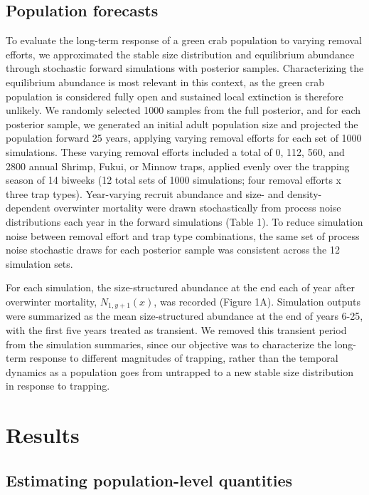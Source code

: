 \documentclass{article}
\begin{document}
\subsection{Population forecasts}

To evaluate the long-term response of a green crab population to varying removal efforts, we approximated the stable size distribution and equilibrium abundance through stochastic forward simulations with posterior samples. Characterizing the equilibrium abundance is most relevant in this context, as the green crab population is considered fully open and sustained local extinction is therefore unlikely. We randomly selected 1000 samples from the full posterior, and for each posterior sample, we generated an initial adult population size and projected the population forward 25 years, applying varying removal efforts for each set of 1000 simulations. These varying removal efforts included a total of 0, 112, 560, and 2800 annual Shrimp, Fukui, or Minnow traps, applied evenly over the trapping season of 14 biweeks (12 total sets of 1000 simulations; four removal efforts x three trap types). Year-varying recruit abundance and size- and density-dependent overwinter mortality were drawn stochastically from process noise distributions each year in the forward simulations (Table 1). To reduce simulation noise between removal effort and trap type combinations, the same set of process noise stochastic draws for each posterior sample was consistent across the 12 simulation sets. 

For each simulation, the size-structured abundance at the end each of year after overwinter mortality, $N_{1,y+1}(x)$, was recorded (Figure 1A). Simulation outputs were summarized as the mean size-structured abundance at the end of years 6-25, with the first five years treated as transient. We removed this transient period from the simulation summaries, since our objective was to characterize the long-term response to different magnitudes of trapping, rather than the temporal dynamics as a population goes from untrapped to a new stable size distribution in response to trapping.

\section{Results}

\subsection{Estimating population-level quantities}
\end{document}

